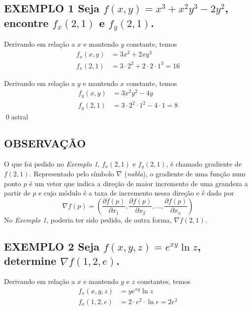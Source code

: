 \documentclass[a4paper, 12pt]{extreport}
\begin{document}
    \subsection*{\small {\color{astral}EXEMPLO 1} \textmd{Seja $f(x,y)=x^3+x^2y^3-2y^2$, encontre $f_x(2,1)$ e $f_y(2,1)$.}}
      \flushleft Derivando em relação a $x$ e mantendo $y$ constante, temos
      \begin{equation*}
        \begin{split}
          f_x(x,y) & = 3x^2 + 2xy^3 \\
          f_x(2,1) & = 3\cdot2^2 + 2\cdot2\cdot1^3 = 16
        \end{split}
      \end{equation*}

      \flushleft Derivando em relação a $y$ e mantendo $x$ constante, temos
      \begin{equation*}
        \begin{split}
          f_y(x,y) & = 3x^2y^2 - 4y \\
          f_y(2,1) & = 3\cdot2^2\cdot1^2 - 4\cdot1 = 8
        \end{split}
      \end{equation*}
      \qed{astral}

    \subsection*{\color{coverup}\small OBSERVAÇÃO}
      \justifying O que foi pedido no \textsl{Exemplo 1}, $f_x(2,1)$ e $f_y(2,1)$, é chamado gradiente de $f(2,1)$.
      Representado pelo símbolo $\nabla$ (\textsl{nabla}), o gradiente de uma função num ponto $p$ é um vetor que indica a direção de
      maior incremento de uma grandeza a partir de $p$ e cujo módulo é a taxa de incremento nessa direção e é dado por
      $$ \nabla f(p) = \left(\frac{\partial f(p)}{\partial x_1}, \frac{\partial f(p)}{\partial x_2},..., \frac{\partial f(p)}{\partial x_n}\right) $$
      No \textsl{Exemplo 1}, poderia ter sido pedido, de outra forma, $\nabla f(2,1)$.

      \subsection*{\small {\color{astral}EXEMPLO 2} \textmd{Seja $f(x,y,z)=e^{xy}\ln{z}$, determine $\nabla f(1,2,e)$.}}
        \flushleft Derivando em relação a $x$ e mantendo $y$ e $z$ constantes, temos
        \begin{equation*}
          \begin{split}
            f_x(x,y,z) & = ye^{xy}\ln{z} \\
            f_x(1,2,e) & = 2 \cdot e^2 \cdot \ln{e} = 2e^2
          \end{split}
        \end{equation*}
\end{document}
